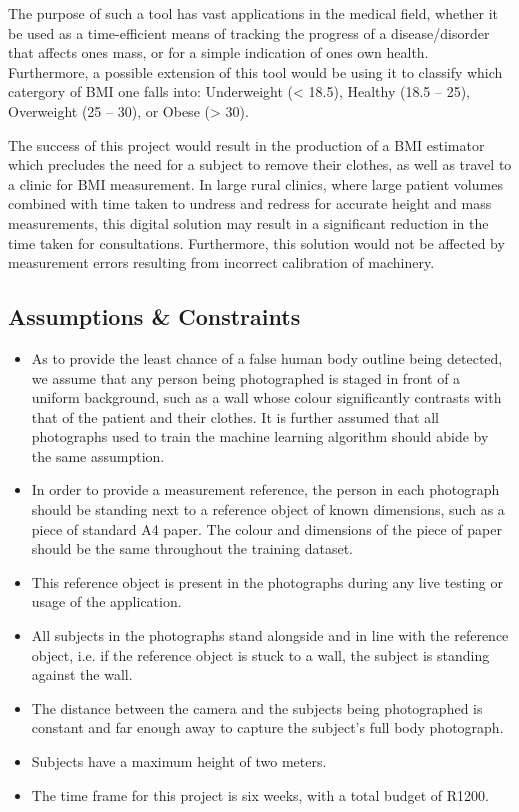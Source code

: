 \documentclass[conference]{IEEEtran}
\begin{document}
The purpose of such a tool has vast applications in the medical field, whether it be used as a time-efficient means of tracking the progress of a disease/disorder that affects ones mass, or for a simple indication of ones own health.
Furthermore, a possible extension of this tool would be using it to classify which catergory of BMI one falls into: Underweight (< 18.5), Healthy (18.5 -- 25), Overweight (25 -- 30), or Obese (> 30).

The success of this project would result in the production of a BMI estimator which precludes the need for a subject to remove their clothes, as well as travel to a clinic for BMI measurement.
In large rural clinics, where large patient volumes combined with time taken to undress and redress for accurate height and mass measurements, this digital solution may result in a significant reduction in the time taken for consultations.
Furthermore, this solution would not be affected by measurement errors resulting from incorrect calibration of machinery.

\subsection{Assumptions \& Constraints}
\begin{itemize}
	\item As to provide the least chance of a false human body outline being detected, we assume that any person being photographed is staged in front of a uniform background, such as a wall whose colour significantly contrasts with that of the patient and their clothes.
	It is further assumed that all photographs used to train the machine learning algorithm should abide by the same assumption.
	\item In order to provide a measurement reference, the person in each photograph should be standing next to a reference object of known dimensions, such as a piece of standard A4 paper. The colour and dimensions of the piece of paper should be the same throughout the training dataset.
	\item This reference object is present in the photographs during any live testing or usage of the application.
	\item All subjects in the photographs stand alongside and in line with the reference object, i.e. if the reference object is stuck to a wall, the subject is standing against the wall.
	\item The distance between the camera and the subjects being photographed is constant and far enough away to capture the subject's full body photograph.
	\item Subjects have a maximum height of two meters.
	\item The time frame for this project is six weeks, with a total budget of R1200.
\end{itemize}
\end{document}
